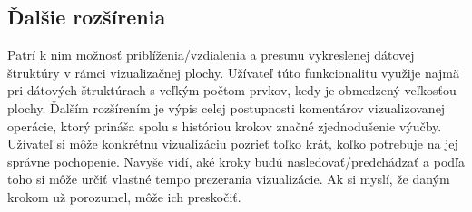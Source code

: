 \subsection{Ďalšie rozšírenia}
Patrí k nim
možnosť priblíženia/vzdialenia a presunu vykreslenej dátovej štruktúry v rámci
vizualizačnej plochy. Užívateľ túto funkcionalitu využije najmä pri dátových
štruktúrach s veľkým počtom prvkov, kedy je obmedzený veľkosťou plochy. Ďalším
rozšírením je výpis celej postupnosti komentárov vizualizovanej operácie,
ktorý prináša spolu s históriou krokov značné zjednodušenie
výučby. Užívateľ si môže konkrétnu vizualizáciu pozrieť toľko krát, koľko
potrebuje na jej správne pochopenie. Navyše vidí, aké kroky budú
nasledovať/predchádzať a podľa toho si môže určiť vlastné tempo prezerania
vizualizácie. Ak si myslí, že daným krokom už porozumel, môže ich preskočiť.

